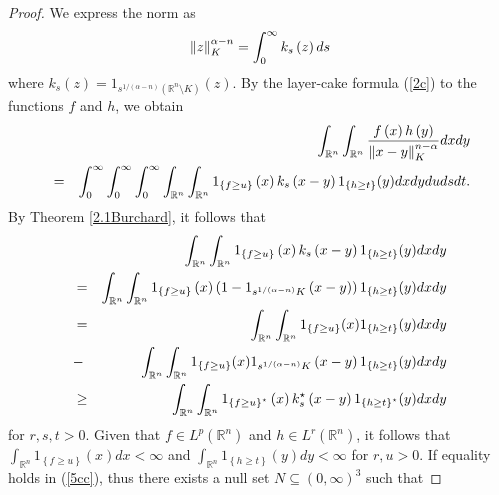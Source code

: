 \documentclass[preprint,12pt]{elsarticle}
\begin{document}
\begin{proof}
We express the norm as 
\begin{eqnarray}
	\left \| z \right \|^{\alpha-n }_{K}=\int_{0}^{\infty }k_{s}\left ( z \right )  ds \notag  
\end{eqnarray}
where $k_{s}\left ( z \right )=1_{s^{1/(\alpha-n)  }\left ( \mathbb{R}^n\setminus K  \right )  }\left ( z \right )$. By the layer-cake formula (\ref{2c}) to the functions $f$ and $h$, we obtain 
\begin{eqnarray}
&&\int_{\mathbb{R}^n}\int_{\mathbb{R}^n}\frac{f\left ( x \right )h\left ( y \right )  }{\left \| x-y \right \|^{n-\alpha } _{K} }dxdy\notag\\
&=&\int_{0}^{\infty }\int_{0}^{\infty }\int_{0}^{\infty } \int_{\mathbb{R}^n }  \int_{\mathbb{R}^n }1_{\left \{ f\ge u \right \} }\left ( x \right )k_{s}\left ( x-y \right )1_{\left \{ h\ge t \right \} }(y)dxdydudsdt.\notag
\end{eqnarray}
By Theorem \ref{2.1Burchard}, it follows that
\begin{eqnarray}
&&\int_{\mathbb{R}^n }  \int_{\mathbb{R}^n }1_{\left \{ f\ge u \right \} }\left ( x \right )k_{s}\left ( x-y \right )1_{\left \{ h\ge t \right \} }(y)dxdy\notag\\
&=&\int_{\mathbb{R}^n }  \int_{\mathbb{R}^n }1_{\left \{ f\ge u \right \} }\left ( x \right )\left ( 1-1_{s^{1/(\alpha-n)  } K}\left ( x-y \right )   \right ) 1_{\left \{ h\ge t \right \} }(y)dxdy\notag\\
&=&\int_{\mathbb{R}^n }  \int_{\mathbb{R}^n }1_{\left \{ f\ge u \right \} }(x)1_{\left \{ h\ge t \right \} }(y)dxdy\notag\\
&-&\int_{\mathbb{R}^n }  \int_{\mathbb{R}^n }1_{\left \{ f\ge u \right \} }(x)1_{s^{1/(\alpha-n)  } K}\left ( x-y \right )1_{\left \{ h\ge t \right \} }(y)dxdy\notag\\
&\ge& \int_{\mathbb{R}^n }  \int_{\mathbb{R}^n }1_{\left \{ f\ge u \right \}^{\star }  }\left ( x \right )k^{\star } _{s}\left ( x-y \right )1_{\left \{ h\ge t \right \}^{\star }  }(y)dxdy\notag 
\end{eqnarray}
for $r,s,t> 0$. Given that $f\in L^{p}\left ( \mathbb{R}^n  \right )$ and $h\in L^{r}\left ( \mathbb{R}^n  \right )$, it follows that $\int_{\mathbb{R}^n }1_{\left \{ f\ge u \right \} }\left ( x \right )dx< \infty$ and $\int_{\mathbb{R}^n }1_{\left \{ h\ge t \right \} }\left ( y \right )dy< \infty$ for $r, u > 0$. If equality holds in (\ref{5cc}), thus there exists a null set $N\subseteq \left ( 0,\infty  \right )^{3}$ such that  

\end{proof}
\end{document}

